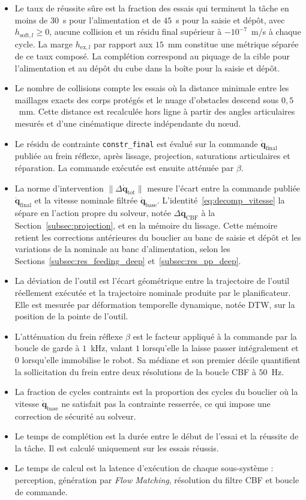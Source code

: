 \begin{itemize}
  \item Le taux de réussite sûre est la fraction des essais qui terminent la tâche en moins de $30$~s pour l'alimentation et de $45$~s pour la saisie et dépôt, avec $h_{\mathrm{soft},l}\geq0$, aucune collision et un résidu final supérieur à $-10^{-7}$~m/s à chaque cycle. La marge $h_{\mathrm{ex},l}$ par rapport aux $15$~mm constitue une métrique séparée de ce taux composé. La complétion correspond au piquage de la cible pour l'alimentation et au dépôt du cube dans la boîte pour la saisie et dépôt.
  \item Le nombre de collisions compte les essais où la distance minimale entre les maillages exacts des corps protégés et le nuage d'obstacles descend sous $0{,}5$~mm. Cette distance est recalculée hors ligne à partir des angles articulaires mesurés et d'une cinématique directe indépendante du n\oe ud.
  \item Le résidu de contrainte \texttt{constr\_final} est évalué sur la commande $\dot{\mathbf{q}}_{\mathrm{final}}$ publiée au frein réflexe, après lissage, projection, saturations articulaires et réparation. La commande exécutée est ensuite atténuée par $\beta$.
  \item La norme d'intervention $\|\Delta\dot{\mathbf{q}}_{\mathrm{tot}}\|$ mesure l'écart entre la commande publiée $\dot{\mathbf{q}}_{\mathrm{final}}$ et la vitesse nominale filtrée $\dot{\mathbf{q}}_{\mathrm{base}}$. L'identité~\eqref{eq:decomp_vitesse} la sépare en l'action propre du solveur, notée $\Delta\dot{\mathbf{q}}_{\mathrm{CBF}}$ à la Section~\ref{subsec:projection}, et en la mémoire du lissage. Cette mémoire retient les corrections antérieures du bouclier au banc de saisie et dépôt et les variations de la nominale au banc d'alimentation, selon les Sections~\ref{subsec:res_feeding_deep} et~\ref{subsec:res_pp_deep}.
  \item La déviation de l'outil est l'écart géométrique entre la trajectoire
  de l'outil réellement exécutée et la trajectoire nominale produite par le
  planificateur. Elle est mesurée par déformation temporelle dynamique, notée \ac{DTW}, sur la position de la pointe de l'outil.
  \item L'atténuation du frein réflexe $\beta$ est le facteur appliqué à la
  commande par la boucle de garde à $1$~kHz, valant $1$ lorsqu'elle la laisse
  passer intégralement et $0$ lorsqu'elle immobilise le robot. Sa médiane et son
  premier décile quantifient la sollicitation du frein entre deux résolutions de
  la boucle \ac{CBF} à $50$~Hz.
  \item La fraction de cycles contraints est la proportion des cycles du
  bouclier où la vitesse $\dot{\mathbf{q}}_{\mathrm{base}}$ ne satisfait pas la contrainte resserrée,
  ce qui impose une correction de sécurité au solveur.
  \item Le temps de complétion est la durée entre le début de l'essai et la réussite de la tâche. Il est calculé uniquement sur les essais réussis.
  \item Le temps de calcul est la latence d'exécution de chaque sous-système : perception, génération par \textit{Flow Matching}, résolution du filtre \ac{CBF} et boucle de commande.
\end{itemize}
